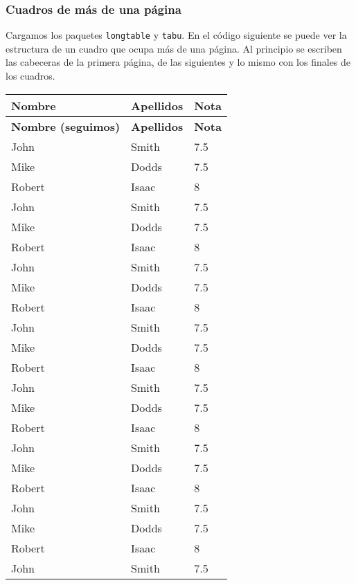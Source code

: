 \documentclass[11pt]{article}
\begin{document}
\subsubsection{Cuadros de más de una página}

Cargamos los paquetes \texttt{longtable} y \texttt{tabu}. En el código siguiente se puede ver la estructura de un cuadro que ocupa más de una página. Al principio se escriben las cabeceras de la primera página, de las siguientes y lo mismo con los finales de los cuadros.

\begin{center}
\begin{longtabu} to 0.7\linewidth{lll} %
\toprule
\textbf{Nombre} & \textbf{Apellidos} & \textbf{Nota} \\
\midrule
\endfirsthead
\toprule
\textbf{Nombre (seguimos)} & \textbf{Apellidos} & \textbf{Nota} \\
\midrule
\endhead
\midrule
\endfoot
\bottomrule
\endlastfoot
John & Smith & 7.5 \\
Mike & Dodds & 7.5 \\
Robert & Isaac & 8 \\
John & Smith & 7.5 \\
Mike & Dodds & 7.5 \\
Robert & Isaac & 8 \\
John & Smith & 7.5 \\
Mike & Dodds & 7.5 \\
Robert & Isaac & 8 \\
John & Smith & 7.5 \\
Mike & Dodds & 7.5 \\
Robert & Isaac & 8 \\
John & Smith & 7.5 \\
Mike & Dodds & 7.5 \\
Robert & Isaac & 8 \\
John & Smith & 7.5 \\
Mike & Dodds & 7.5 \\
Robert & Isaac & 8 \\
John & Smith & 7.5 \\
Mike & Dodds & 7.5 \\
Robert & Isaac & 8 \\
John & Smith & 7.5 \\

\end{longtabu}
\end{center}
\end{document}
